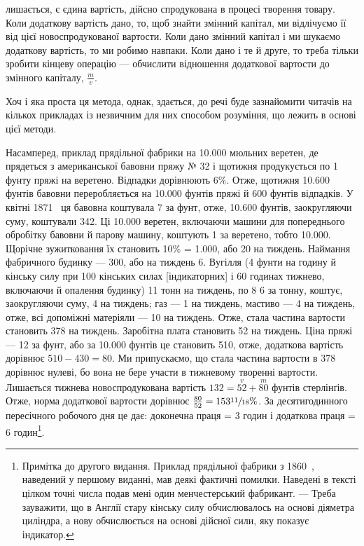 \parcont{}  %
лишається, є єдина вартість, дійсно спродукована в процесі творення товару. Коли додаткову вартість
дано, то, щоб знайти змінний капітал, ми відлічуємо її від цієї новоспродукованої вартости.
Коли дано змінний капітал і ми шукаємо додаткову вартість, то ми робимо навпаки. Коли дано і те й
друге, то треба тільки зробити кінцеву операцію — обчислити відношення додаткової вартости до
змінного капіталу, $\frac{m}{v}$.

Хоч і яка проста ця метода, однак, здається, до речі буде зазнайомити читачів на кількох прикладах
із незвичним для них
способом розуміння, що лежить в основі цієї методи.

Насамперед, приклад прядільної фабрики на \num{10.000} мюльних веретен, де прядеться з американської
бавовни пряжу № 32 і
щотижня продукується по 1 фунту пряжі на веретено. Відпадки дорівнюють 6\%. Отже, щотижня \num{10.600}
фунтів бавовни переробляється на \num{10.000} фунтів пряжі й 600 фунтів відпадків. У квітні 1871~ ця
бавовна коштувала 7 за фунт, отже, \num{10.600} фунтів, заокругляючи суму, коштували 342. Ці \num{10.000}
веретен, включаючи машини для попереднього обробітку бавовни й парову машину, коштують 1 за веретено, тобто \num{10.000}. Щорічне зужитковання їх становить
10\% = \num{1.000}, або 20 на тиждень. Наймання фабричного будинку —
300, або на тиждень 6. Вугілля (4 фунти на годину
й кінську силу при 100 кінських силах [індикаторних] і 60 годинах тижнево, включаючи й опалення
будинку) 11 тонн
на тиждень, по 8 6 за тонну, коштує, заокругляючи суму, 4 на
тиждень; газ — 1 на тиждень, мастиво — 4 на тиждень, отже, всі
допоміжні матеріяли — 10 на тиждень. Отже, стала частина вартости становить 378
на тиждень. Заробітна плата становить 52 на тиждень. Ціна пряжі — 12 за
фунт, або за \num{10.000} фунтів
це становить 510, отже, додаткова вартість дорівнює $510 - 430 = 80$. Ми припускаємо, що стала частина вартости в 378 дорівнює нулеві, бо
вона не бере участи в тижневому творенні вартости.
Лишається тижнева новоспродукована вартість $132 = \overset{v}{52} + \overset{m}{80}$ фунтів стерлінґів. Отже, норма
додаткової вартости дорівнює
$\frac{80}{52} = 153\sfrac{11}{18}\%$. За десятигодинного пересічного робочого дня це дає: доконечна праця = 3
годин і додаткова праця = 6 годин\footnote{
Примітка до другого видання. Приклад прядільної фабрики з 1860~, наведений у першому виданні,
мав деякі фактичні помилки. Наведені в тексті цілком точні числа подав мені один менчестерський
фабрикант. — Треба зауважити, що в Англії стару кінську силу обчислювалось
на основі діяметра циліндра, а нову обчислюється на основі дійсної сили, яку показує індикатор.
}.
